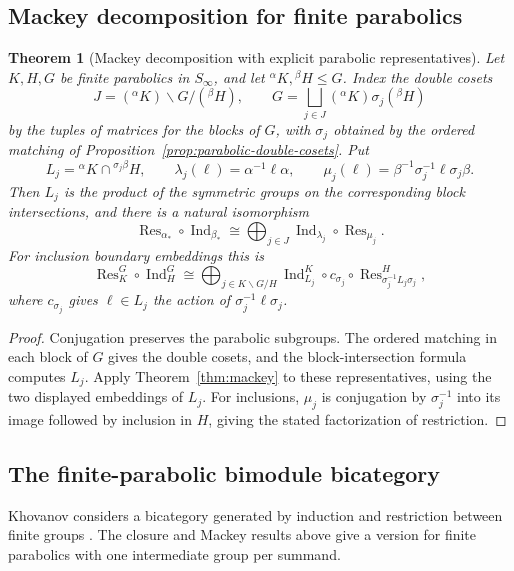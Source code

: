\documentclass[11pt,a4paper]{article}
\numberwithin{equation}{section}
\newtheorem{theorem}{Theorem}[section]
\theoremstyle{definition}
\newcommand{\Ind}{\operatorname{Ind}}
\newcommand{\Res}{\operatorname{Res}}
\newcommand{\cg}[2]{{}^{#1}\!#2}
\begin{document}
\subsection{Mackey decomposition for finite parabolics}
\label{sec:mackey-finite-parabolic}

\begin{theorem}[Mackey decomposition with explicit parabolic representatives]
\label{thm:mackey-finite-parabolic}
Let \(K,H,G\) be finite parabolics in \(S_\infty\), and let
\(\cg{\alpha}{K},\cg{\beta}{H}\le G\). Index the double cosets
\[
 J=(\cg{\alpha}{K})\backslash G/(\cg{\beta}{H}),
 \qquad
 G=\bigsqcup_{j\in J}(\cg{\alpha}{K})\sigma_j(\cg{\beta}{H})
\]
by the tuples of matrices for the blocks of \(G\), with
\(\sigma_j\) obtained by the ordered matching of
Proposition~\ref{prop:parabolic-double-cosets}. Put
\[
 L_j=\cg{\alpha}{K}\cap\cg{\sigma_j\beta}{H},
 \qquad
 \lambda_j(\ell)=\alpha^{-1}\ell\alpha,\qquad
 \mu_j(\ell)=\beta^{-1}\sigma_j^{-1}\ell\sigma_j\beta .
\]
Then \(L_j\) is the product of the symmetric groups on the
corresponding block intersections, and there is a natural
isomorphism
\[
 \Res_{\alpha_*}\circ\Ind_{\beta_*}
   \cong\bigoplus_{j\in J}\Ind_{\lambda_j}\circ\Res_{\mu_j}.
\]
For inclusion boundary embeddings this is
\[
 \Res_K^G\circ\Ind_H^G
 \cong \bigoplus_{j\in K\backslash G/H}
   \Ind_{L_j}^K\circ c_{\sigma_j}\circ
   \Res_{\sigma_j^{-1}L_j\sigma_j}^{H},
\]
where \(c_{\sigma_j}\) gives \(\ell\in L_j\) the action of
\(\sigma_j^{-1}\ell\sigma_j\).
\end{theorem}

\begin{proof}
Conjugation preserves the parabolic subgroups. The ordered matching
in each block of \(G\) gives the double cosets, and the
block-intersection formula computes \(L_j\). Apply
Theorem~\ref{thm:mackey} to these representatives, using the two
displayed embeddings of \(L_j\). For inclusions,
\(\mu_j\) is conjugation by \(\sigma_j^{-1}\) into its image
followed by inclusion in \(H\), giving the stated factorization
of restriction.
\end{proof}

\subsection{The finite-parabolic bimodule bicategory}
\label{sec:parabolic-bicategory}

Khovanov considers a bicategory generated by induction and restriction
between finite groups \cite[\S~3.2]{khovanov}. The closure and Mackey
results above give a version for finite parabolics with one intermediate
group per summand.
\end{document}
